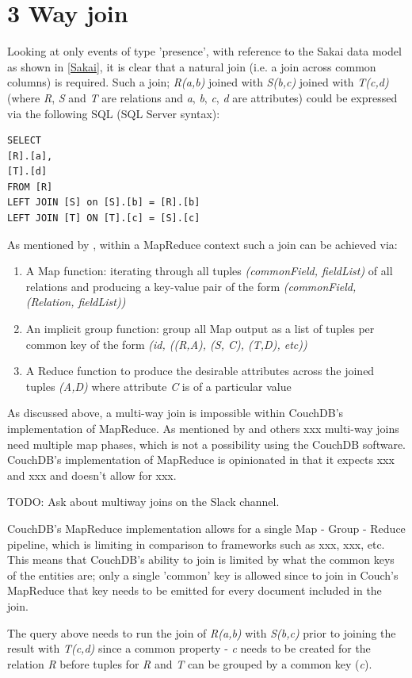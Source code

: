 \section{3 Way join}

Looking at only events of type 'presence', with reference to the Sakai data model as shown in \ref{Sakai}, it is clear that a natural join (i.e. a join across common columns) is required. Such a join; \textit{R(a,b)} joined with \textit{S(b,c)} joined with \textit{T(c,d)} (where \textit{R}, \textit{S} and \textit{T} are relations and \textit{a}, \textit{b}, \textit{c}, \textit{d} are attributes) could be expressed via the following SQL (SQL Server syntax):

\begin{verbatim}
SELECT
[R].[a],
[T].[d]
FROM [R]
LEFT JOIN [S] on [S].[b] = [R].[b]
LEFT JOIN [T] ON [T].[c] = [S].[c]
\end{verbatim}

As mentioned by \cite{mining2011}, within a MapReduce context such a join can be achieved via:
\begin{enumerate}
    \item A Map function: iterating through all tuples \textit{(commonField, fieldList)} of all relations and producing a key-value pair of the form \textit{(commonField, (Relation, fieldList))}
    \item An implicit group function: group all Map output as a list of tuples per common key of the form \textit{(id, ((R,A), (S, C), (T,D), etc))}
    \item A Reduce function to produce the desirable attributes across the joined tuples \textit{(A,D)} where attribute \textit{C} is of a particular value
\end{enumerate}

As discussed above, a multi-way join is impossible within CouchDB's implementation of MapReduce. As mentioned by \cite{chandar2010} and others xxx multi-way joins need multiple map phases, which is not a possibility using the CouchDB software. CouchDB's implementation of MapReduce is opinionated in that it expects xxx and xxx and doesn't allow for xxx.

TODO: Ask about multiway joins on the Slack channel.

CouchDB's MapReduce implementation allows for a single Map - Group - Reduce pipeline, which is limiting in comparison to frameworks such as xxx, xxx, etc. This means that CouchDB's ability to join is limited by what the common keys of the entities are; only a single 'common' key is allowed since to join in Couch's MapReduce that key needs to be emitted for every document included in the join.

The query above needs to run the join of \textit{R(a,b)} with \textit{S(b,c)} prior to joining the result with \textit{T(c,d)} since a common property - \textit{c} needs to be created for the relation \textit{R} before tuples for \textit{R} and \textit{T} can be grouped by a common key (\textit{c}).
